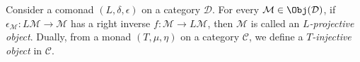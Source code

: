 	\item Consider a comonad $(L,\delta,\epsilon)$ on a category $\mathcal{D}$.
	For every $\mathcal{M}\in\Obj(\mathcal{D})$, if
	$\epsilon_{\mathcal{M}}:L\mathcal{M}\to\mathcal{M}$ has a right inverse
	$f:\mathcal{M}\to L\mathcal{M}$, then $\mathcal{M}$ is called an
	\emph{$L$-projective object}. Dually, from a monad $(T,\mu,\eta)$ on a
	category $\mathcal{C}$, we define a \emph{$T$-injective object} in
	$\mathcal{C}$.
